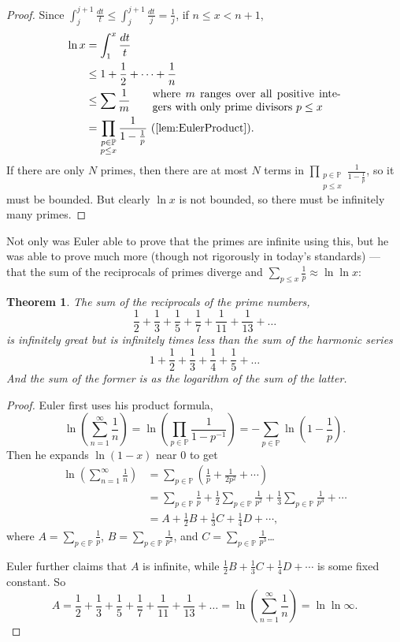 \documentclass[a4paper]{article}
\newtheorem{theorem}{Theorem}[section]
\theoremstyle{definition}
\theoremstyle{remark}
\begin{document}
\begin{proof}
  Since $\int_j^{j+1}\frac{dt}{t}\le\int_j^{j+1}\frac{dt}{j}=\frac{1}{j}$, if $n\le x<n+1$, 
  \begin{align*}
    \ln x&=\int_1^x\frac{dt}{t}\\
    &\le1+\frac{1}{2}+\dots+\frac{1}{n}\\
    &\le\sum\frac{1}{m}\qquad\parbox{6cm}{where $m$ ranges over all positive integers with only prime divisors $p\le x$}\\
    &=\prod\limits_{\substack{p\in\mathbb{P}\\p\le x}}\frac{1}{1-\frac{1}{p}}\text{ (\cref{lem:EulerProduct})}
    .
  \end{align*}
  If there are only $N$ primes, then there are at most $N$ terms in $\displaystyle\prod\limits_{\substack{p\in\mathbb{P}\\p\le x}}\frac{1}{1-\frac{1}{p}}$, so it must be bounded. But clearly $\ln x$ is not bounded, so there must be infinitely many primes.
\end{proof}

Not only was Euler able to prove that the primes are infinite using this, but he was able to prove much more (though not rigorously in today's standards) --- that the sum of the reciprocals of primes diverge and $\sum_{p\le x}\frac{1}{p}\approx\ln\ln x$:

\begin{theorem}
  The sum of the reciprocals of the prime numbers,
  \[
  \frac{1}{2}+\frac{1}{3}+\frac{1}{5}+\frac{1}{7}+\frac{1}{11}+\frac{1}{13}+\dots
  \]
  is infinitely great but is infinitely times less than the sum of the harmonic series
  \[
  1+\frac{1}{2}+\frac{1}{3}+\frac{1}{4}+\frac{1}{5}+\dots
  \]
  And the sum of the former is as the logarithm of the sum of the latter.
  \label{thm:EulerReciprocalOfPrimes}
\end{theorem}
\begin{proof}
  Euler first uses his product formula,
  \[
  \ln\left( \sum_{n=1}^\infty\frac{1}{n} \right)=\ln\left( \prod_{p\in\mathbb{P}}\frac{1}{1-p^{-1}} \right)=-\sum_{p\in\mathbb{P}}\ln\left( 1-\frac{1}{p} \right)
  .
  \]
  Then he expands $\ln(1-x)$ near $0$ to get
  \begin{align*}
    \ln\left( \sum_{n=1}^\infty\frac{1}{n} \right)&=\sum_{p\in\mathbb{P}}\left( \frac{1}{p}+\frac{1}{2p^2}+\cdots \right)\\
    &=\sum_{p\in\mathbb{P}}\frac{1}{p}+\frac{1}{2}\sum_{p\in\mathbb{P}}\frac{1}{p^2}+\frac{1}{3}\sum_{p\in\mathbb{P}}\frac{1}{p^3}+\cdots\\
    &=A+\frac{1}{2}B+\frac{1}{3}C+\frac{1}{4}D+\cdots
    ,
  \end{align*}
  where $\displaystyle A=\sum_{p\in\mathbb{P}}\frac{1}{p}$, $\displaystyle B=\sum_{p\in\mathbb{P}}\frac{1}{p^2}$, and $\displaystyle C=\sum_{p\in\mathbb{P}}\frac{1}{p^3}$\dots

  Euler further claims that $A$ is infinite, while $\frac{1}{2}B+\frac{1}{3}C+\frac{1}{4}D+\cdots$ is some fixed constant. So 
  \[
  A=\frac{1}{2}+\frac{1}{3}+\frac{1}{5}+\frac{1}{7}+\frac{1}{11}+\frac{1}{13}+\dots=\ln \left( \sum_{n=1}^\infty\frac{1}{n} \right) = \ln\ln\infty
  .
  \]
\end{proof}
\end{document}
